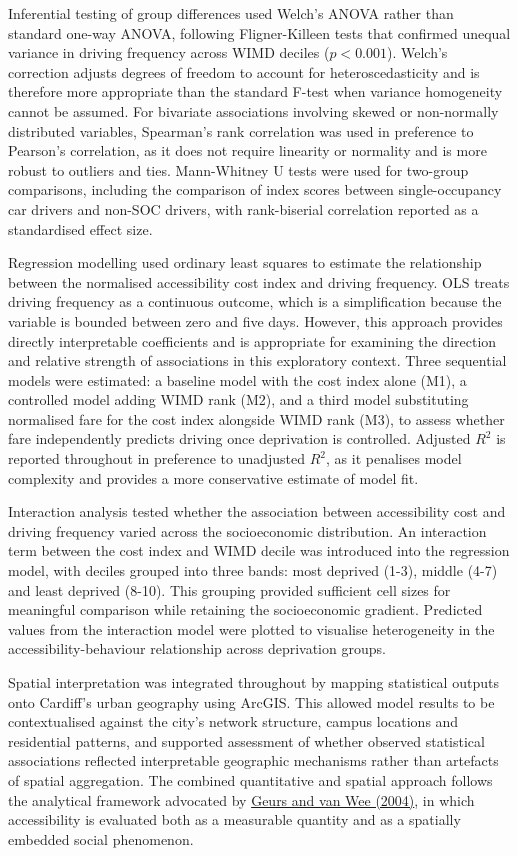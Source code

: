 \documentclass[11pt,a4paper]{article}
\newcommand{\hcite}[2]{\hyperlink{#1}{#2}}
\newcommand{\hcite}[2]{\hyperlink{#1}{#2}}
\begin{document}
Inferential testing of group differences used Welch's ANOVA rather than standard one-way ANOVA, following Fligner-Killeen tests that confirmed unequal variance in driving frequency across WIMD deciles ($p < 0.001$). Welch's correction adjusts degrees of freedom to account for heteroscedasticity and is therefore more appropriate than the standard F-test when variance homogeneity cannot be assumed. For bivariate associations involving skewed or non-normally distributed variables, Spearman's rank correlation was used in preference to Pearson's correlation, as it does not require linearity or normality and is more robust to outliers and ties. Mann-Whitney U tests were used for two-group comparisons, including the comparison of index scores between single-occupancy car drivers and non-SOC drivers, with rank-biserial correlation reported as a standardised effect size.

Regression modelling used ordinary least squares to estimate the relationship between the normalised accessibility cost index and driving frequency. OLS treats driving frequency as a continuous outcome, which is a simplification because the variable is bounded between zero and five days. However, this approach provides directly interpretable coefficients and is appropriate for examining the direction and relative strength of associations in this exploratory context. Three sequential models were estimated: a baseline model with the cost index alone (M1), a controlled model adding WIMD rank (M2), and a third model substituting normalised fare for the cost index alongside WIMD rank (M3), to assess whether fare independently predicts driving once deprivation is controlled. Adjusted $R^2$ is reported throughout in preference to unadjusted $R^2$, as it penalises model complexity and provides a more conservative estimate of model fit.

Interaction analysis tested whether the association between accessibility cost and driving frequency varied across the socioeconomic distribution. An interaction term between the cost index and WIMD decile was introduced into the regression model, with deciles grouped into three bands: most deprived (1-3), middle (4-7) and least deprived (8-10). This grouping provided sufficient cell sizes for meaningful comparison while retaining the socioeconomic gradient. Predicted values from the interaction model were plotted to visualise heterogeneity in the accessibility-behaviour relationship across deprivation groups.

Spatial interpretation was integrated throughout by mapping statistical outputs onto Cardiff's urban geography using ArcGIS. This allowed model results to be contextualised against the city's network structure, campus locations and residential patterns, and supported assessment of whether observed statistical associations reflected interpretable geographic mechanisms rather than artefacts of spatial aggregation. The combined quantitative and spatial approach follows the analytical framework advocated by \hcite{geurs2004}{Geurs and van Wee (2004)}, in which accessibility is evaluated both as a measurable quantity and as a spatially embedded social phenomenon.
\end{document}
